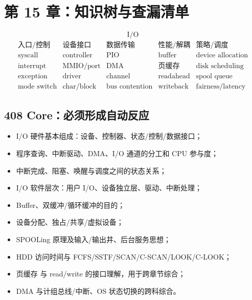 \documentclass[UTF8,fontset=fandol,11pt,a4paper]{ctexart}
\begin{document}
\section{第 15 章：知识树与查漏清单}

\begin{corebox}[I/O 知识树]
\[
\boxed{\text{I/O}}
\]
\[
\begin{array}{lllll}
\text{入口/控制} & \text{设备接口} & \text{数据传输} & \text{性能/解耦} & \text{策略/调度}\\[0.3em]
\text{syscall} & \text{controller} & \text{PIO} & \text{buffer} & \text{device allocation}\\
\text{interrupt} & \text{MMIO/port} & \text{DMA} & \text{页缓存} & \text{disk scheduling}\\
\text{exception} & \text{driver} & \text{channel} & \text{readahead} & \text{spool queue}\\
\text{mode switch} & \text{char/block} & \text{bus contention} & \text{writeback} & \text{fairness/latency}
\end{array}
\]
\end{corebox}

\subsection{408 Core：必须形成自动反应}
\begin{itemize}
  \item I/O 硬件基本组成：设备、控制器、状态/控制/数据接口；
  \item 程序查询、中断驱动、DMA、I/O 通道的分工和 CPU 参与度；
  \item 中断完成、阻塞、唤醒与调度之间的状态关系；
  \item I/O 软件层次：用户 I/O、设备独立层、驱动、中断处理；
  \item Buffer、双缓冲/循环缓冲的目的；
  \item 设备分配、独占/共享/虚拟设备；
  \item SPOOLing 原理及输入/输出井、后台服务思想；
  \item HDD 访问时间与 FCFS/SSTF/SCAN/C-SCAN/LOOK/C-LOOK；
  \item 页缓存 与 read/write 的接口理解，用于跨章节综合；
  \item DMA 与计组总线/中断、OS 状态切换的跨科综合。
\end{itemize}
\end{document}
